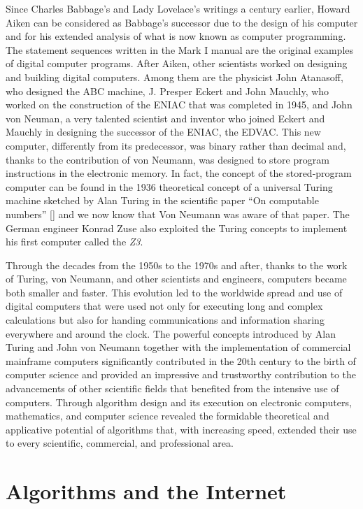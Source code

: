 {{{Since Charles Babbage's and Lady Lovelace's writings a century earlier, Howard Aiken can be considered as Babbage's successor due to the design of his computer and for his extended analysis of what is now known as computer programming. The statement sequences written in the Mark I manual are the original examples of digital computer programs. After Aiken, other scientists worked on designing and building digital computers. Among them are the physicist John Atanasoff, who designed the ABC machine, J. Presper Eckert and John Mauchly, who worked on the construction of the ENIAC that was completed in 1945, and John von Neuman, a very talented scientist and inventor who joined Eckert and Mauchly in designing the successor of the ENIAC, the EDVAC. This new computer, differently from its predecessor, was binary rather than decimal and, thanks to the contribution of von Neumann, was designed to store program instructions in the electronic memory. In fact, the concept of the stored-program computer can be found in the 1936 theoretical concept of a universal Turing machine sketched by Alan Turing in the scientific paper ``On computable numbers'' [\citealt{chap:01:Turing:1937}] and we now know that Von Neumann was aware of that paper. The German engineer Konrad Zuse also exploited the Turing concepts to implement his first computer called the \textit{Z3}.

Through the decades from the 1950s to the 1970s and after, thanks to the work of Turing, von Neumann, and other scientists and engineers, computers became both smaller and faster. This evolution led to the worldwide spread and use of digital computers that were used not only for executing long and complex calculations but also for handing communications and information sharing everywhere and around the clock. The powerful concepts introduced by Alan Turing and John von Neumann together with the implementation of commercial mainframe \hbox{computers} significantly contributed in the 20th century to the birth of computer science and provided an impressive and trustworthy contribution to the advancements of other scientific fields that benefited from the intensive use of computers. Through algorithm design and its execution on electronic computers, mathematics, and computer science revealed the formidable theoretical and applicative potential of algorithms that, with increasing speed, extended their use to every scientific, commercial, and professional area.

\section{\label{sec:1.8}Algorithms and the Internet}

}}}
